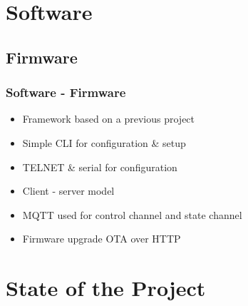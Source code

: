 \documentclass[aspectratio=169]{beamer}
\begin{document}
\section{Software}
\subsection{Firmware}
\begin{frame}
\frametitle{Software - Firmware}
\begin{itemize}
\item Framework based on a previous project
\item Simple CLI for configuration \& setup
\item TELNET \& serial for configuration 
\item Client - server model
\item MQTT used for control channel and state channel
\item Firmware upgrade OTA over HTTP
\end{itemize}
\end{frame}

\section{State of the Project}
\end{document}
